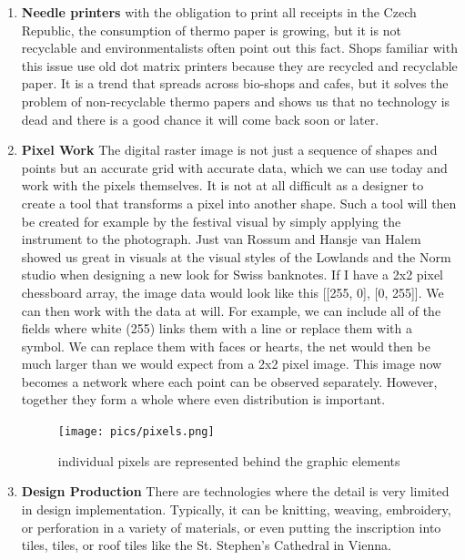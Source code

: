 \documentclass[a4paper]{article}
\begin{document}
\begin{enumerate}
\item \textbf{Needle printers} with the obligation to print all receipts in the Czech Republic, the consumption of thermo paper is growing, but it is not recyclable and environmentalists often point out this fact. Shops familiar with this issue use old dot matrix printers because they are recycled and recyclable paper. It is a trend that spreads across bio-shops and cafes, but it solves the problem of non-recyclable thermo papers and shows us that no technology is dead and there is a good chance it will come back soon or later.

\item \textbf{Pixel Work}
The digital raster image is not just a sequence of shapes and points but an accurate grid with accurate data, which we can use today and work with the pixels themselves. It is not at all difficult as a designer to create a tool that transforms a pixel into another shape. Such a tool will then be created for example by the festival visual by simply applying the instrument to the photograph. Just van Rossum and Hansje van Halem showed us great in visuals at the visual styles of the Lowlands and the Norm studio when designing a new look for Swiss banknotes. If I have a 2x2 pixel chessboard array, the image data would look like this [[255, 0], [0, 255]]. We can then work with the data at will. For example, we can include all of the fields where white (255) links them with a line or replace them with a symbol. We can replace them with faces or hearts, the net would then be much larger than we would expect from a 2x2 pixel image. This image now becomes a network where each point can be observed separately. However, together they form a whole where even distribution is important.

\begin{figure} [H]
  \texttt{[image: pics/pixels.png]}
  \caption{individual pixels are represented behind the graphic elements}
\end{figure}

\item \textbf{Design Production}
There are technologies where the detail is very limited in design implementation. Typically, it can be knitting, weaving, embroidery, or perforation in a variety of materials, or even putting the inscription into tiles, tiles, or roof tiles like the St. Stephen's Cathedral in Vienna.
\end{enumerate}
\end{document}

